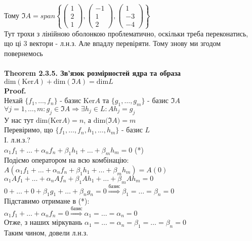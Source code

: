 \documentclass[a4paper, 14pt]{extarticle}
\def\th#1{\textbf{Theorem {#1}}}
\def\proof{\textbf{Proof.}\\}
\def\bigline{\vspace{5mm}\\}
\def\dim#1{\textrm{dim} {#1}}
\begin{document}
	Тому $\Im A = span \left\{ \begin{pmatrix} 1 \\ 2 \\ 1 \end{pmatrix}, \begin{pmatrix} -1 \\ 1 \\ 2 \end{pmatrix}, \begin{pmatrix} 1 \\ -3 \\ -4 \end{pmatrix} \right\}$\\
	Тут трохи з лінійною оболонкою проблематично, оскільки треба переконатись, що ці 3 вектори - л.н.з. Але впадлу перевіряти. Тому знову ми згодом повернемось\\
	\bigline
	\th{2.3.5. Зв'язок розмірностей ядра та образа}\\
	$\dim{(\textrm{Ker} A)} + \dim{(\Im A)} = \dim L$\\
	\proof
	Нехай $\{f_1, \dots, f_n\}$ - базис $\textrm{Ker} A$ та $\{g_1, \dots, g_m\}$ - базис $\Im A$\\
	$\forall j = 1,\dots,m: g_j \in \Im A \Rightarrow \exists h_j \in L: Ah_j = g_j$\\
	У нас тут $\dim (\textrm{Ker} A) = n$, а $\dim(\Im A) = m$\\
	Перевіримо, що $\{f_1,\dots, f_n, h_1,\dots, h_m\}$ - базис $L$
	\bigline
	I. л.н.з.?\\
	$\alpha_1 f_1 + \dots + \alpha_n f_n + \beta_1 h_1 + \dots + \beta_m h_m = 0$ (*)\\
	Подіємо оператором на всю комбінацію:\\
	$A(\alpha_1 f_1 + \dots + \alpha_n f_n + \beta_1 h_1 + \dots + \beta_m h_m) = A(0)$\\
	$\alpha_1 Af_1 + \dots + \alpha_n Af_n + \beta_1 Ah_1 + \dots + \beta_m A h_m = 0$\\
	$0 + \dots + 0 + \beta_1 g_1 + \dots + \beta_n g_n = 0 \overset{\textrm{базис}}{\Rightarrow} \beta_1 = \dots = \beta_n = 0$\\
	Підставимо отримане в (*):\\
	$\alpha_1 f_1 + \dots + \alpha_n f_n = 0 \overset{\textrm{базис}}{\Rightarrow} \alpha_1 = \dots = \alpha_n = 0$\\
	Отже, з наших міркувань $\alpha_1 = \dots = \alpha_n = \beta_1 = \dots = \beta_n = 0$\\
	Таким чином, довели л.н.з.
	\bigline
\end{document}
